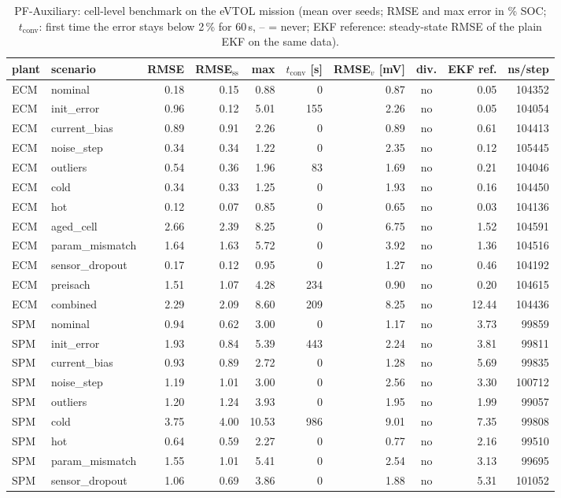 \begin{table}[H]\centering\footnotesize\setlength{\tabcolsep}{4pt}
\caption{PF-Auxiliary: cell-level benchmark on the eVTOL mission (mean over seeds; RMSE and max error in \% SOC; $t_\mathrm{conv}$: first time the error stays below 2\,\% for 60\,s, -- = never; EKF reference: steady-state RMSE of the plain EKF on the same data).}\label{tab:cell_PFAuxiliary}
\begin{tabular}{llrrrrrcrr}\toprule
plant & scenario & RMSE & RMSE$_\mathrm{ss}$ & max & $t_\mathrm{conv}$ [s] & RMSE$_v$ [mV] & div. & EKF ref. & ns/step \\ \midrule
ECM & nominal & 0.18 & 0.15 & 0.88 & 0 & 0.87 & no & 0.05 & 104352 \\
ECM & init\_error & 0.96 & 0.12 & 5.01 & 155 & 2.26 & no & 0.05 & 104054 \\
ECM & current\_bias & 0.89 & 0.91 & 2.26 & 0 & 0.89 & no & 0.61 & 104413 \\
ECM & noise\_step & 0.34 & 0.34 & 1.22 & 0 & 2.35 & no & 0.12 & 105445 \\
ECM & outliers & 0.54 & 0.36 & 1.96 & 83 & 1.69 & no & 0.21 & 104046 \\
ECM & cold & 0.34 & 0.33 & 1.25 & 0 & 1.93 & no & 0.16 & 104450 \\
ECM & hot & 0.12 & 0.07 & 0.85 & 0 & 0.65 & no & 0.03 & 104136 \\
ECM & aged\_cell & 2.66 & 2.39 & 8.25 & 0 & 6.75 & no & 1.52 & 104591 \\
ECM & param\_mismatch & 1.64 & 1.63 & 5.72 & 0 & 3.92 & no & 1.36 & 104516 \\
ECM & sensor\_dropout & 0.17 & 0.12 & 0.95 & 0 & 1.27 & no & 0.46 & 104192 \\
ECM & preisach & 1.51 & 1.07 & 4.28 & 234 & 0.90 & no & 0.20 & 104615 \\
ECM & combined & 2.29 & 2.09 & 8.60 & 209 & 8.25 & no & 12.44 & 104436 \\
\midrule
SPM & nominal & 0.94 & 0.62 & 3.00 & 0 & 1.17 & no & 3.73 & 99859 \\
SPM & init\_error & 1.93 & 0.84 & 5.39 & 443 & 2.24 & no & 3.81 & 99811 \\
SPM & current\_bias & 0.93 & 0.89 & 2.72 & 0 & 1.28 & no & 5.69 & 99835 \\
SPM & noise\_step & 1.19 & 1.01 & 3.00 & 0 & 2.56 & no & 3.30 & 100712 \\
SPM & outliers & 1.20 & 1.24 & 3.93 & 0 & 1.95 & no & 1.99 & 99057 \\
SPM & cold & 3.75 & 4.00 & 10.53 & 986 & 9.01 & no & 7.35 & 99808 \\
SPM & hot & 0.64 & 0.59 & 2.27 & 0 & 0.77 & no & 2.16 & 99510 \\
SPM & param\_mismatch & 1.55 & 1.01 & 5.41 & 0 & 2.54 & no & 3.13 & 99695 \\
SPM & sensor\_dropout & 1.06 & 0.69 & 3.86 & 0 & 1.88 & no & 5.31 & 101052 \\
\bottomrule\end{tabular}\end{table}
